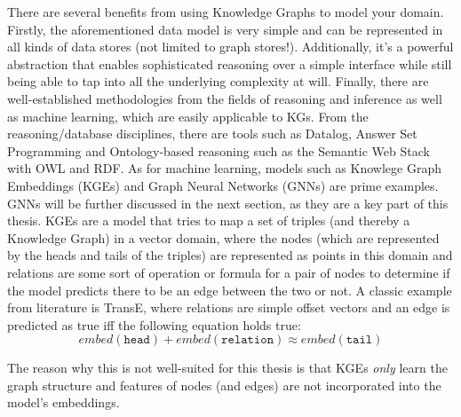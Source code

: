 \documentclass[draft,final]{vutinfth} %
\begin{document}
There are several benefits from using Knowledge Graphs to model your domain. Firstly, the aforementioned data model is very simple and can be represented in all kinds of data stores (not limited to graph stores!). Additionally, it's a powerful abstraction that enables sophisticated reasoning over a simple interface while still being able to tap into all the underlying complexity at will. Finally, there are well-established methodologies from the fields of reasoning and inference as well as machine learning, which are easily applicable to KGs. From the reasoning/database disciplines, there are tools such as Datalog, Answer Set Programming and Ontology-based reasoning such as the Semantic Web Stack with OWL and RDF. As for machine learning, models such as Knowlege Graph Embeddings (KGEs) and Graph Neural Networks (GNNs) are prime examples. GNNs will be further discussed in the next section, as they are a key part of this thesis. KGEs are a model that tries to map a set of triples (and thereby a Knowledge Graph) in a vector domain, where the nodes (which are represented by the heads and tails of the triples) are represented as points in this domain and relations are some sort of operation or formula for a pair of nodes to determine if the model predicts there to be an edge between the two or not. A classic example from literature is TransE, where relations are simple offset vectors and an edge is predicted as true iff the following equation holds true: $$embed(\mathtt{head}) + embed(\mathtt{relation}) \approx embed(\mathtt{tail})$$ 

The reason why this is not well-suited for this thesis is that KGEs \textit{only} learn the graph structure and features of nodes (and edges) are not incorporated into the model's embeddings.
\end{document}
